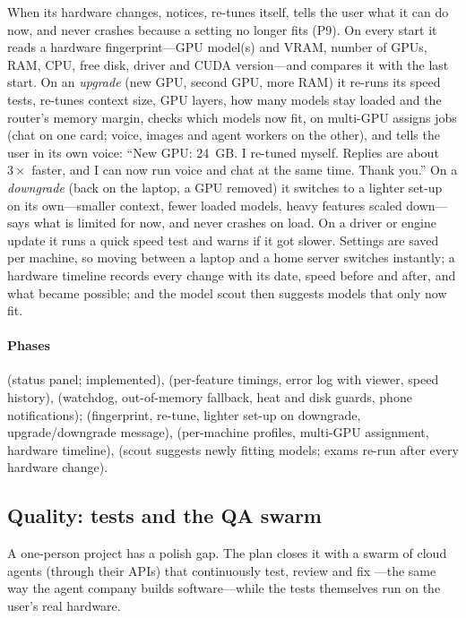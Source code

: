 When its hardware changes, \hivi{} notices, re-tunes itself, tells the user what it can do now, and never crashes because a setting no longer fits (P9). On every start it reads a hardware fingerprint---GPU model(s) and VRAM, number of GPUs, RAM, CPU, free disk, driver and CUDA version---and compares it with the last start. On an \emph{upgrade} (new GPU, second GPU, more RAM) it re-runs its speed tests, re-tunes context size, GPU layers, how many models stay loaded and the router's memory margin, checks which models now fit, on multi-GPU assigns jobs (chat on one card; voice, images and agent workers on the other), and tells the user in its own voice: ``New GPU: 24~GB. I re-tuned myself. Replies are about $3\times$ faster, and I can now run voice and chat at the same time. Thank you.'' On a \emph{downgrade} (back on the laptop, a GPU removed) it switches to a lighter set-up on its own---smaller context, fewer loaded models, heavy features scaled down---says what is limited for now, and never crashes on load. On a driver or engine update it runs a quick speed test and warns if it got slower. Settings are saved per machine, so moving between a laptop and a home server switches instantly; a hardware timeline records every change with its date, speed before and after, and what became possible; and the model scout then suggests models that only now fit.

\paragraph{Phases}  (status panel; implemented),  (per-feature timings, error log with viewer, speed history),  (watchdog, out-of-memory fallback, heat and disk guards, phone notifications);  (fingerprint, re-tune, lighter set-up on downgrade, upgrade/downgrade message),  (per-machine profiles, multi-GPU assignment, hardware timeline),  (scout suggests newly fitting models; exams re-run after every hardware change).

\subsection{Quality: tests and the QA swarm}

A one-person project has a polish gap. The plan closes it with a swarm of cloud agents (through their APIs) that continuously test, review and fix \hivi{}---the same way the agent company builds software---while the tests themselves run on the user's real hardware.

